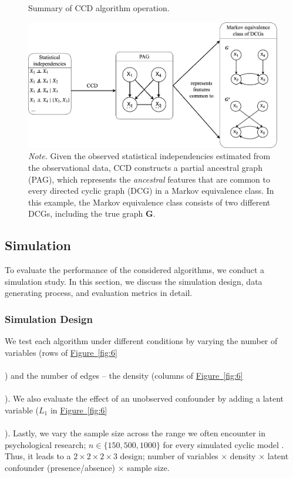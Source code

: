 \documentclass[twoside, 11pt]{article}
\newcommand*{\figref}[2][]{%
  \hyperref[{fig:#2}]{%
    Figure~\ref*{fig:#2}%
    \ifx\\#1\\%
    \else
      #1%
    \fi
  }%
}
\begin{document}
\begin{figure}[t]
    \centering
        \caption{Summary of CCD algorithm operation.}
        \includegraphics[width=1\textwidth]{figures/CCDsummaryedited.png}
        \vspace{-1mm}
        \caption*{\small{\textit{Note.} Given the observed statistical independencies estimated from the observational data, CCD constructs a partial ancestral graph (PAG), which represents the \textit{ancestral} features that are common to every directed cyclic graph (DCG) in a Markov equivalence class. In this example, the Markov equivalence class consists of two different DCGs, including the true graph $\boldsymbol{G}$.}}
    \label{fig:5}
\end{figure}



\subsection{Simulation}

To evaluate the performance of the considered algorithms, we conduct a simulation study. In this section, we discuss the simulation design, data generating process, and evaluation metrics in detail.

\subsubsection{Simulation Design}
We test each algorithm under different conditions by varying the number of variables (rows of \figref{6}) and the number of edges -- the density (columns of \figref{6}). We also evaluate the effect of an unobserved confounder by adding a latent variable ($L_1$ in \figref{6}). Lastly, we vary the sample size across the range we often encounter in psychological research; $n \in \{150, 500, 1000\}$ for every simulated cyclic model \citep{constantin2022}. Thus, it leads to a $2 \times 2 \times 2 \times 3$ design; number of variables $\times$ density $\times$ latent confounder (presence/absence) $\times$ sample size.
\end{document}
